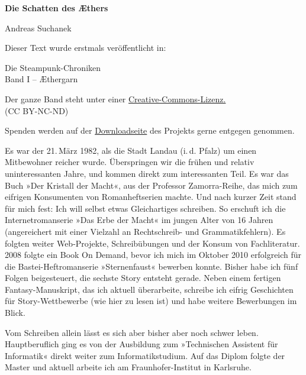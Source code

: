 \usepackage[ngerman]{babel}
\usepackage[T1]{fontenc}



\renewcommand*{\tb}{\begin{center}* \quad * \quad *\end{center}}

\newcommand\bigpar\medskip
\newcommand\gedanke\textit


\raggedbottom
\begin{center}
\textbf{\huge\textsf{Die Schatten des Æthers}}

\bigskip
Andreas Suchanek
\end{center}

\bigskip

\begin{flushleft}
Dieser Text wurde erstmals veröffentlicht in:
\begin{center}
Die Steampunk-Chroniken\\
Band I -- Æthergarn
\end{center}

\bigskip

Der ganze Band steht unter einer
\href{http://creativecommons.org/licenses/by-nc-nd/2.0/de/}{Creative-Commons-Lizenz.} \\
(CC BY-NC-ND)

\bigskip

Spenden werden auf der
\href{http://steampunk-chroniken.de/download}{Downloadseite}
des Projekts gerne entgegen genommen.

\vfill

Es war der 21.\,März 1982, als die Stadt Landau (i.\,d. Pfalz) um
einen Mitbewohner reicher wurde. Überspringen wir die frühen und
relativ uninteressanten Jahre, und kommen direkt zum interessanten
Teil. Es war das Buch »Der Kristall der Macht«, aus der Professor
Zamorra-Reihe, das mich zum eifrigen Konsumenten von
Romanheftserien machte. Und nach kurzer Zeit stand für mich fest:
Ich will selbst etwas Gleichartiges schreiben. So erschuft ich die
Internetromanserie »Das Erbe der Macht« im jungen Alter von 16
Jahren (angereichert mit einer Vielzahl an Rechtschreib- und
Grammatikfehlern). Es folgten weiter Web-Projekte, Schreibübungen
und der Konsum von Fachliteratur. 2008 folgte ein Book On Demand,
bevor ich mich im Oktober 2010 erfolgreich für die
Bastei-Heftromanserie »Sternenfaust« bewerben konnte. Bisher habe
ich fünf Folgen beigesteuert, die sechste Story entsteht gerade.
Neben einem fertigen Fantasy-Manuskript, das ich aktuell
überarbeite, schreibe ich eifrig Geschichten für Story-Wettbewerbe
(wie hier zu lesen ist) und habe weitere Bewerbungen im Blick.

\bigpar

Vom Schreiben allein lässt es sich aber bisher aber noch schwer
leben. Hauptberuflich ging es von der Ausbildung zum »Technischen
Assistent für Informatik« direkt weiter zum Informatikstudium. Auf
das Diplom folgte der Master und aktuell arbeite ich am
Fraunhofer-Institut in Karlsruhe.
\end{flushleft}

